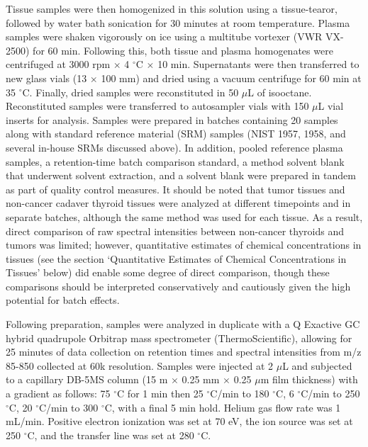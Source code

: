 Tissue samples were then homogenized in this solution using a tissue-tearor, followed by water bath sonication for 30 minutes at room temperature. Plasma samples were shaken vigorously on ice using a multitube vortexer (VWR VX-2500) for 60 min. Following this, both tissue and plasma homogenates were centrifuged at 3000 rpm $\times$ 4 $^{\circ}$C $\times$ 10 min. Supernatants were then transferred to new glass vials (13 $\times$ 100 mm) and dried using a vacuum centrifuge for 60 min at 35 $^{\circ}$C. Finally, dried samples were reconstituted in 50 $\mu$L of isooctane. Reconstituted samples were transferred to autosampler vials with 150 $\mu$L vial inserts for analysis. Samples were prepared in batches containing 20 samples along with standard reference material (SRM) samples (NIST 1957, 1958, and several in-house SRMs discussed above). In addition, pooled reference plasma samples, a retention-time batch comparison standard, a method solvent blank that underwent solvent extraction, and a solvent blank were prepared in tandem as part of quality control measures. It should be noted that tumor tissues and non-cancer cadaver thyroid tissues were analyzed at different timepoints and in separate batches, although the same method was used for each tissue. As a result, direct comparison of raw spectral intensities between non-cancer thyroids and tumors was limited; however, quantitative estimates of chemical concentrations in tissues (see the section `Quantitative Estimates of Chemical Concentrations in Tissues' below) did enable some degree of direct comparison, though these comparisons should be interpreted conservatively and cautiously given the high potential for batch effects.

Following preparation, samples were analyzed in duplicate with a Q Exactive GC hybrid quadrupole Orbitrap mass spectrometer (ThermoScientific), allowing for 25 minutes of data collection on retention times and spectral intensities from m/z 85-850 collected at 60k resolution. Samples were injected at 2 $\mu$L and subjected to a capillary DB-5MS column (15 m $\times$ 0.25 mm $\times$ 0.25 $\mu$m film thickness) with a gradient as follows: 75 $^{\circ}$C for 1 min then 25 $^{\circ}$C/min to 180 $^{\circ}$C, 6 $^{\circ}$C/min to 250 $^{\circ}$C, 20 $^{\circ}$C/min to 300 $^{\circ}$C, with a final 5 min hold. Helium gas flow rate was 1 mL/min. Positive electron ionization was set at 70 eV, the ion source was set at 250 $^{\circ}$C, and the transfer line was set at 280 $^{\circ}$C.

\vspace{1em}

